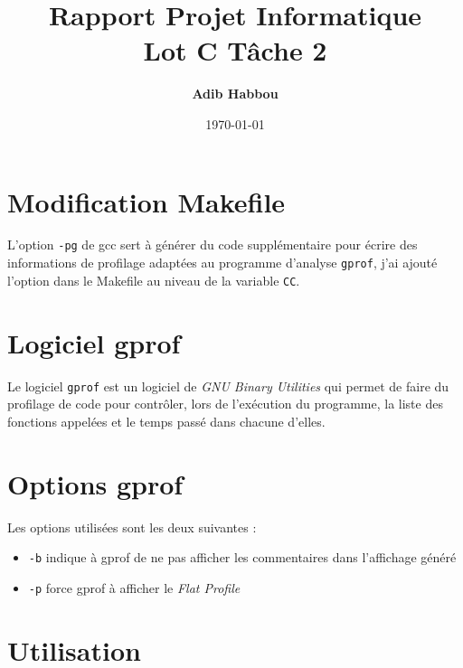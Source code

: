 \documentclass[a4paper, 12pt]{article}
\date{\today}
\title{\huge{\textbf{Rapport Projet Informatique\\Lot C Tâche 2}}}
\author{\textbf{Adib Habbou}}
\begin{document}
\begin{titlingpage}
\maketitle
\end{titlingpage}
\newpage
\tableofcontents
{}
\newpage

\section{Modification Makefile}

L'option \verb|-pg| de gcc sert à générer du code supplémentaire pour écrire des informations de profilage adaptées au programme d'analyse \verb|gprof|, j'ai ajouté l'option dans le Makefile au niveau de la variable \verb|CC|.

\section{Logiciel gprof}

Le logiciel \verb|gprof| est un logiciel de \emph{GNU Binary Utilities} qui permet de faire du profilage de code pour contrôler, lors de l'exécution du programme, la liste des fonctions appelées et le temps passé dans chacune d'elles.

\section{Options gprof}

Les options utilisées sont les deux suivantes :
\begin{itemize}[label=$\cdot$]
    \item \verb|-b| indique à gprof de ne pas afficher les commentaires dans l'affichage généré
    \item \verb|-p| force gprof à afficher le \emph{Flat Profile}
\end{itemize}

\section{Utilisation}
\end{document}
